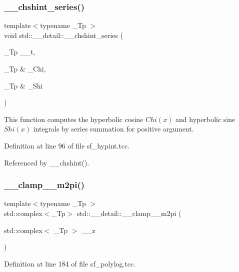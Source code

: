 \subsubsection{\texorpdfstring{\+\_\+\+\_\+chshint\+\_\+series()}{\_\_chshint\_series()}}
{\footnotesize\ttfamily template$<$typename \+\_\+\+Tp $>$ \\
void std\+::\+\_\+\+\_\+detail\+::\+\_\+\+\_\+chshint\+\_\+series (\begin{DoxyParamCaption}\item[{\+\_\+\+Tp}]{\+\_\+\+\_\+t,  }\item[{\+\_\+\+Tp \&}]{\+\_\+\+Chi,  }\item[{\+\_\+\+Tp \&}]{\+\_\+\+Shi }\end{DoxyParamCaption})}



This function computes the hyperbolic cosine $ Chi(x) $ and hyperbolic sine $ Shi(x) $ integrals by series summation for positive argument. 



Definition at line 96 of file sf\+\_\+hypint.\+tcc.



Referenced by \+\_\+\+\_\+chshint().

\mbox{\label{namespacestd_1_1____detail_a4b52c9c0f24edd3c61c771f55f20002b}} 
\subsubsection{\texorpdfstring{\+\_\+\+\_\+clamp\+\_\+\_\+m2pi()}{\_\_clamp\_0\_m2pi()}}
{\footnotesize\ttfamily template$<$typename \+\_\+\+Tp $>$ \\
std\+::complex$<$\+\_\+\+Tp$>$ std\+::\+\_\+\+\_\+detail\+::\+\_\+\+\_\+clamp\+\_\+\_\+m2pi (\begin{DoxyParamCaption}\item[{std\+::complex$<$ \+\_\+\+Tp $>$}]{\+\_\+\+\_\+z }\end{DoxyParamCaption})}



Definition at line 184 of file sf\+\_\+polylog.\+tcc.



